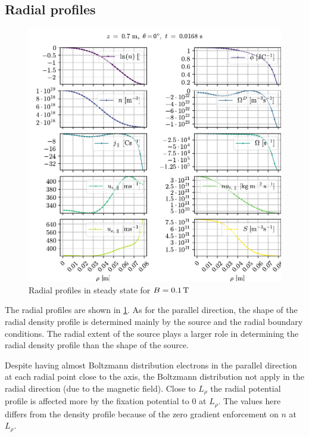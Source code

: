 \subsection{Radial profiles}
%
\begin{figure}[htb]
    \centering
    \includegraphics[width=1.0\textwidth]{fig/results/1DProfiles/B010Rad}
    \caption{Radial profiles in steady state for $B=0.1\, \text{T}$}
    \label{fig:radProfs}
\end{figure}
%
The radial profiles are shown in \cref{fig:radProfs}.
As for the parallel direction, the shape of the radial density profile is determined mainly by the source and the radial boundary conditions.
The radial extent of the source plays a larger role in determining the radial density profile than the shape of the source.

Despite having almost Boltzmann distribution electrons in the parallel direction at each radial point close to the axis, the Boltzmann distribution not apply in the radial direction (due to the magnetic field).
Close to $L_\rho$ the radial potential profile is affected more by the fixation potential to $0$ at $L_\rho$.
The values here differs from the density profile because of the zero gradient enforcement on $n$ at $L_\rho$.

